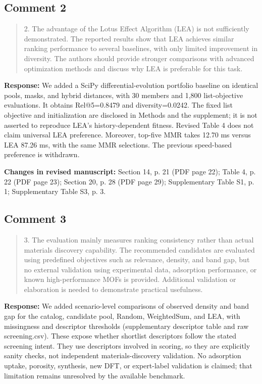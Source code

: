 \documentclass[11pt,a4paper]{article}
\begin{document}
\subsection*{Comment 2}
\begin{quote}\small 2. The advantage of the Lotus Effect Algorithm (LEA) is not sufficiently demonstrated. The reported results show that LEA achieves similar ranking performance to several baselines, with only limited improvement in diversity. The authors should provide stronger comparisons with advanced optimization methods and discuss why LEA is preferable for this task.\end{quote}
\textbf{Response:} We added a SciPy differential-evolution portfolio baseline on identical pools, masks, and hybrid distances, with 30 members and 1,800 list-objective evaluations. It obtains Rel@5=0.8479 and diversity=0.0242. The fixed list objective and initialization are disclosed in Methods and the supplement; it is not asserted to reproduce LEA's history-dependent fitness. Revised Table 4 does not claim universal LEA preference. Moreover, top-five MMR takes 12.70 ms versus LEA 87.26 ms, with the same MMR selections. The previous speed-based preference is withdrawn.

\textbf{Changes in revised manuscript:} Section 14, p. 21 (PDF page 22); Table 4, p. 22 (PDF page 23); Section 20, p. 28 (PDF page 29); Supplementary Table S1, p. 1; Supplementary Table S3, p. 3.

\subsection*{Comment 3}
\begin{quote}\small 3. The evaluation mainly measures ranking consistency rather than actual materials discovery capability. The recommended candidates are evaluated using predefined objectives such as relevance, density, and band gap, but no external validation using experimental data, adsorption performance, or known high-performance MOFs is provided. Additional validation or elaboration is needed to demonstrate practical usefulness.\end{quote}
\textbf{Response:} We added scenario-level comparisons of observed density and band gap for the catalog, candidate pool, Random, WeightedSum, and LEA, with missingness and descriptor thresholds (supplementary descriptor table and raw screening.csv). These expose whether shortlist descriptors follow the stated screening intent. They use descriptors involved in scoring, so they are explicitly sanity checks, not independent materials-discovery validation. No adsorption uptake, porosity, synthesis, new DFT, or expert-label validation is claimed; that limitation remains unresolved by the available benchmark.
\end{document}
